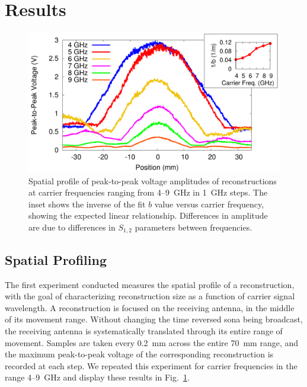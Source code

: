 \section{Results}


\begin{figure}[t!]
\includegraphics[width=\columnwidth]{figs/freq_profile.pdf}
\caption{Spatial profile of peak-to-peak voltage amplitudes of reconstructions 
at carrier frequencies ranging from \numrange{4}{9}~GHz in 1~GHz
steps. The inset shows the inverse of the fit $b$ value versus carrier
frequency, showing the expected linear relationship. Differences in amplitude
are due to differences in $S_{1,2}$ parameters between frequencies.}
\label{fig:freq_profile}
\end{figure}


\subsection{Spatial Profiling}
\label{sec:spatial}

The first experiment conducted measures the spatial profile of a reconstruction,
with the goal of characterizing reconstruction size as a function of carrier
signal wavelength.
%
A reconstruction is focused on the receiving antenna, in the middle of its
movement range.
%
Without changing the time reversed sona being broadcast, the receiving antenna
is systematically translated through its entire range of movement.
%
Samples are taken every 0.2~mm across the entire 70~mm range, and the
maximum peak-to-peak voltage of the corresponding reconstruction is recorded at
each step.
%
We repeated this experiment for carrier frequencies in the range
\numrange{4}{9}~GHz and display these results in Fig.~\ref{fig:freq_profile}.



